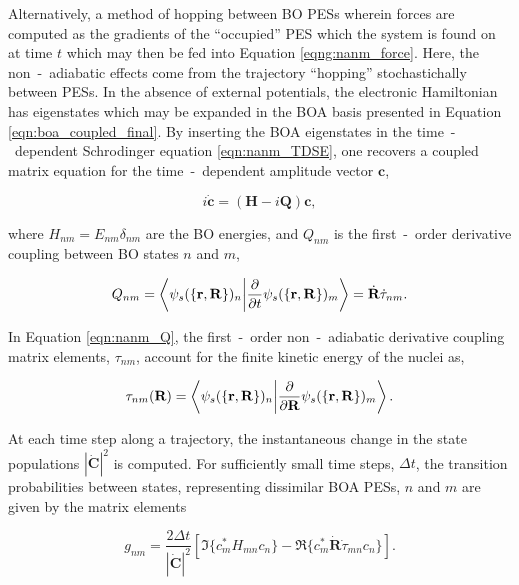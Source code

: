 Alternatively, a method of hopping between BO PESs wherein forces are computed as the gradients of the ``occupied'' PES which the system is found on at time $t$ which may then be fed into Equation \ref{eqng:nanm_force}. Here, the non~-~adiabatic effects come from the trajectory ``hopping'' stochastichally between PESs. In the absence of external potentials, the electronic Hamiltonian has eigenstates which may be expanded in the BOA basis presented in Equation \ref{eqn:boa_coupled_final}. By inserting the BOA eigenstates in the time~-~dependent Schrodinger equation \ref{eqn:nanm_TDSE}, one recovers a coupled matrix equation for the time~-~dependent amplitude vector $\textbf{c}$,

\begin{equation}
    i \dot{\textbf{c}} = \left( \textbf{H} -i\textbf{Q} \right)\textbf{c},
    \label{eqn:nanm_matrix}
\end{equation}

where $H_{nm} = E_{nm}\delta_{nm}$ are the BO energies, and $Q_{nm}$ is the first~-~order derivative coupling between BO states $n$ and $m$,

\begin{equation}
    Q_{nm} = \braket{\psi_{s}(\{ \mathbf{r}, \mathbf{R} \}) _{n}}{\frac{\partial}{\partial t} \psi_{s}(\{ \mathbf{r}, \mathbf{R} \}) _{m}} = \dot{\textbf{R}} \dot \tau_{nm}.
    \label{eqn:nanm_Q}
\end{equation}

In Equation \ref{eqn:nanm_Q}, the first~-~order non~-~adiabatic derivative coupling matrix elements, $\tau_{nm}$, account for the finite kinetic energy of the nuclei as,

\begin{equation}
    \tau_{nm}(\textbf{R}) = \braket{\psi_{s}(\{ \mathbf{r}, \mathbf{R} \}) _{n}}{\frac{\partial}{\partial \textbf{R}} \psi_{s}(\{ \mathbf{r}, \mathbf{R} \}) _{m}}.
    \label{eqn:nanm_Tau}
\end{equation}

At each time step along a trajectory, the instantaneous change in the state populations $|\dot{\textbf{C}}|^{2}$ is computed. For sufficiently small time steps, $\Delta t$, the transition probabilities between states, representing dissimilar BOA PESs, $n$ and $m$ are given by the matrix elements

\begin{equation}
    g_{nm} = \frac{2\Delta t}{|\dot{\textbf{C}}|^{2}} \left[ \Im \lbrace c_{m}^{*} H_{mn} c_{n} \rbrace - \Re \lbrace c_{m}^{*} \dot{\textbf{R}}\dot \tau_{mn} c_{n} \rbrace \right].
\end{equation}

